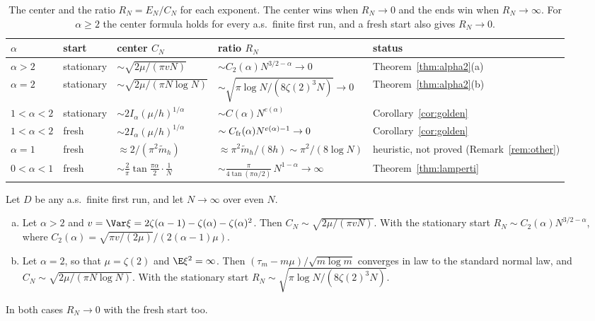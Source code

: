 \begin{table}[t]
\centering\footnotesize
\setlength{\tabcolsep}{4pt}
\begin{tabular}{@{}lllll@{}}
\toprule
$\alpha$ & start & center $C_N$ & ratio $R_N$ & status\\
\midrule
$\alpha>2$ & stationary & $\sim\sqrt{2\mu/(\pi vN)}$ & $\sim C_2(\alpha)N^{3/2-\alpha}\to0$ & Theorem~\ref{thm:alpha2}(a)\\
$\alpha=2$ & stationary & $\sim\sqrt{2\mu/(\pi N\log N)}$ & $\sim\sqrt{\pi\log N/(8\zeta(2)^3N)}\to0$ & Theorem~\ref{thm:alpha2}(b)\\
$1<\alpha<2$ & stationary & $\sim2I_\alpha(\mu/h)^{1/\alpha}$ & $\sim C(\alpha)N^{e(\alpha)}$ & Corollary~\ref{cor:golden}\\
$1<\alpha<2$ & fresh & $\sim2I_\alpha(\mu/h)^{1/\alpha}$ & $\sim C_{\rm fr}(\alpha)N^{e(\alpha)-1}\to0$ & Corollary~\ref{cor:golden}\\
$\alpha=1$ & fresh & $\approx2/(\pi^2\tilde m_h)$ & $\approx\pi^2\tilde m_h/(8h)\sim\pi^2/(8\log N)$ & heuristic, not proved (Remark~\ref{rem:other})\\
$0<\alpha<1$ & fresh & $\sim\frac2\pi\tan\frac{\pi\alpha}2\cdot\frac1N$ & $\sim\frac{\pi}{4\tan(\pi\alpha/2)}\,N^{1-\alpha}\to\infty$ & Theorem~\ref{thm:lamperti}\\
\bottomrule
\end{tabular}
\caption{The center and the ratio $R_N=E_N/C_N$ for each exponent. The center
wins when $R_N\to0$ and the ends win when $R_N\to\infty$. For $\alpha\ge2$ the
center formula holds for every a.s.\ finite first run, and a fresh start also
gives $R_N\to0$.}
\label{tab:outcomes}
\end{table}

\begin{theorem}[$\alpha\ge2$]\label{thm:alpha2}
Let $D$ be any a.s.\ finite first run, and let $N\to\infty$ over even $N$.
\begin{enumerate}[(a)]
\item Let $\alpha>2$ and
$v=\Var\xi=2\zeta(\alpha-1)-\zeta(\alpha)-\zeta(\alpha)^2$. Then
$C_N\sim\sqrt{2\mu/(\pi vN)}$. With the stationary start
$R_N\sim C_2(\alpha)N^{3/2-\alpha}$, where
$C_2(\alpha)=\sqrt{\pi v/(2\mu)}\big/(2(\alpha-1)\mu)$.
\item Let $\alpha=2$, so that $\mu=\zeta(2)$ and $\E\xi^2=\infty$. Then
$(\tau_m-m\mu)/\sqrt{m\log m}$ converges in law to the standard normal law,
and $C_N\sim\sqrt{2\mu/(\pi N\log N)}$. With the stationary start
$R_N\sim\sqrt{\pi\log N/(8\zeta(2)^3N)}$.
\end{enumerate}
In both cases $R_N\to0$ with the fresh start too.
\end{theorem}

